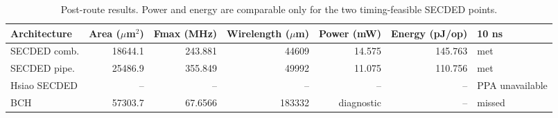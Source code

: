 \begin{table}[t]
\caption{Post-route results. Power and energy are comparable only for the two timing-feasible SECDED points.}
\label{tab:results}
\centering
\footnotesize
\setlength{\tabcolsep}{5.0pt}
\begin{tabular}{lrrrrrl}
\toprule
Architecture & Area ($\mu$m$^2$) & Fmax (MHz) & Wirelength ($\mu$m) & Power (mW) & Energy (pJ/op) & 10 ns \\
\midrule
SECDED comb. & 18644.1 & 243.881 & 44609 & 14.575 & 145.763 & met \\
SECDED pipe. & 25486.9 & 355.849 & 49992 & 11.075 & 110.756 & met \\
Hsiao SECDED & -- & -- & -- & -- & -- & PPA unavailable \\
BCH & 57303.7 & 67.6566 & 183332 & diagnostic & -- & missed \\
\bottomrule
\end{tabular}
\end{table}
